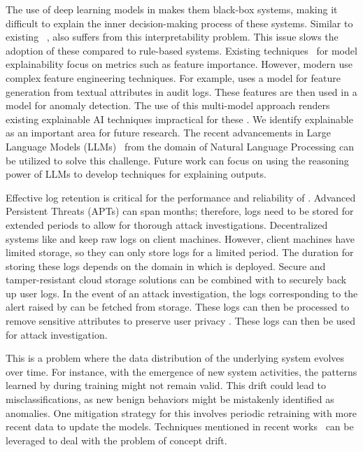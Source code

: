  The use of deep learning models in \pids makes them black-box systems, making it difficult to explain the inner decision-making process of these systems. Similar to existing \pids~\cite{flash2024,cheng2023kairos,yangprographer}, \Sys also suffers from this interpretability problem. This issue slows the adoption of these \pids compared to rule-based systems. Existing techniques~\cite{antwarg2021explaining,brown2018recurrent,ardito2021revisiting,hwang2021sfd} for model explainability focus on metrics such as feature importance. However, modern \pids use complex feature engineering techniques. For example, \flash uses a \wordvec model for feature generation from textual attributes in audit logs. These features are then used in a \gnn model for anomaly detection. The use of this multi-model approach renders existing explainable AI techniques impractical for these \pids. We identify explainable \pids as an important area for future research. The recent advancements in Large Language Models (LLMs)~\cite{chang2024survey} from the domain of Natural Language Processing can be utilized to solve this challenge. Future work can focus on using the reasoning power of LLMs to develop techniques for explaining \pids outputs.

 Effective log retention \cite{wilbert2012log} is critical for the performance and reliability of \pids. Advanced Persistent Threats (APTs) can span months; therefore, logs need to be stored for extended periods to allow for thorough attack investigations. Decentralized systems like \Sys and \disdet \cite{dong2023distdet} keep raw logs on client machines. However, client machines have limited storage, so they can only store logs for a limited period. The duration for storing these logs depends on the domain in which \Sys is deployed. Secure and tamper-resistant cloud storage solutions \cite{kumar2018secure} can be combined with \Sys to securely back up user logs. In the event of an attack investigation, the logs corresponding to the alert raised by \Sys can be fetched from storage. These logs can then be processed to remove sensitive attributes to preserve user privacy \cite{portillo2019towards}. These logs can then be used for attack investigation.

 This is a problem where the data distribution of the underlying system evolves over time. For instance, with the emergence of new system activities, the patterns learned by \Sys during training might not remain valid. This drift could lead to misclassifications, as new benign behaviors might be mistakenly identified as anomalies. One mitigation strategy for this involves periodic retraining with more recent data to update the models. Techniques mentioned in recent works~\cite{lu2018learning, barbero2022transcending,jordaney2017transcend} can be leveraged to deal with the problem of concept drift.


